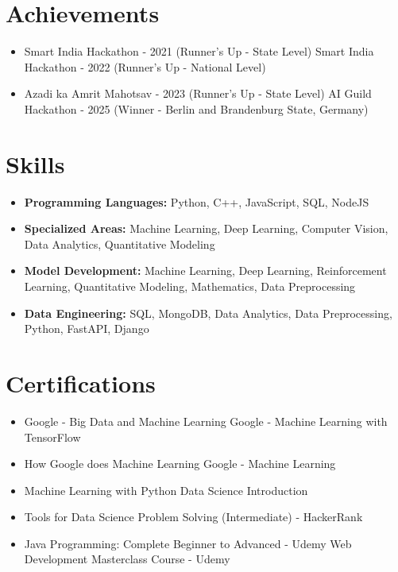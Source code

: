 \documentclass[a4paper,10pt]{article}
\begin{document}
\section*{Achievements}
\begin{itemize}
\item Smart India Hackathon - 2021 (Runner's Up - State Level) \hfill Smart India Hackathon - 2022 (Runner's Up - National Level)
\item Azadi ka Amrit Mahotsav - 2023 (Runner's Up - State Level) \hfill AI Guild Hackathon - 2025 (Winner - Berlin and Brandenburg State, Germany)
\end{itemize}

\section*{Skills}
\begin{itemize}
  \item \textbf{Programming Languages:} Python, C++, JavaScript, SQL, NodeJS
  \item \textbf{Specialized Areas:} Machine Learning, Deep Learning, Computer Vision, Data Analytics, Quantitative Modeling
  \item \textbf{Model Development:} Machine Learning, Deep Learning, Reinforcement Learning, Quantitative Modeling, Mathematics, Data Preprocessing
  \item \textbf{Data Engineering:} SQL, MongoDB, Data Analytics, Data Preprocessing, Python, FastAPI, Django
\end{itemize}

\section*{Certifications}
\begin{itemize}
\item Google - Big Data and Machine Learning \hfill Google - Machine Learning with TensorFlow
\item How Google does Machine Learning \hfill Google - Machine Learning
\item Machine Learning with Python \hfill Data Science Introduction
\item Tools for Data Science \hfill Problem Solving (Intermediate) - HackerRank
\item Java Programming: Complete Beginner to Advanced - Udemy \hfill Web Development Masterclass Course - Udemy
\end{itemize}
\end{document}
